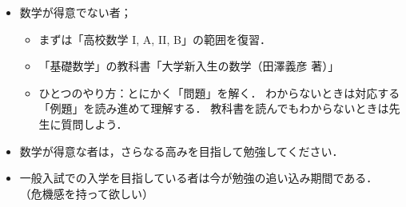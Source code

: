\documentclass[a4j,landscape,25pt]{jsarticle}
\begin{document}
\begin{itemize}
\item 数学が得意でない者；
\begin{itemize}
\item まずは「高校数学 I, A, II, B」の範囲を復習．
\item 「基礎数学」の教科書「大学新入生の数学（田澤義彦 著）」
\item ひとつのやり方：とにかく「問題」を解く．
わからないときは対応する「例題」を読み進めて理解する．
教科書を読んでもわからないときは先生に質問しよう．\\
\end{itemize}
\item 数学が得意な者は，さらなる高みを目指して勉強してください．\\
\item 一般入試での入学を目指している者は今が勉強の追い込み期間である．\\
（危機感を持って欲しい）
\end{itemize}
\end{document}

